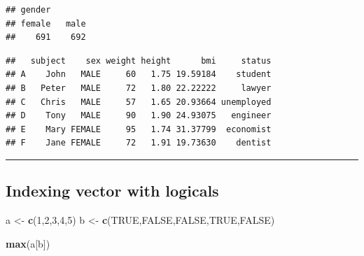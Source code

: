 \documentclass[]{article}
\newenvironment{Shaded}{\begin{snugshade}}{\end{snugshade}}
\newcommand{\KeywordTok}[1]{\textcolor[rgb]{0.13,0.29,0.53}{\textbf{{#1}}}}
\newcommand{\DataTypeTok}[1]{\textcolor[rgb]{0.13,0.29,0.53}{{#1}}}
\newcommand{\DecValTok}[1]{\textcolor[rgb]{0.00,0.00,0.81}{{#1}}}
\newcommand{\StringTok}[1]{\textcolor[rgb]{0.31,0.60,0.02}{{#1}}}
\newcommand{\CommentTok}[1]{\textcolor[rgb]{0.56,0.35,0.01}{\textit{{#1}}}}
\newcommand{\OtherTok}[1]{\textcolor[rgb]{0.56,0.35,0.01}{{#1}}}
\newcommand{\NormalTok}[1]{{#1}}
\numberwithin{equation}{section}
\begin{document}
\begin{verbatim}
## gender
## female   male 
##    691    692
\end{verbatim}

\begin{Shaded}
\end{Shaded}

\begin{verbatim}
##   subject    sex weight height      bmi     status
## A    John   MALE     60   1.75 19.59184    student
## B   Peter   MALE     72   1.80 22.22222     lawyer
## C   Chris   MALE     57   1.65 20.93664 unemployed
## D    Tony   MALE     90   1.90 24.93075   engineer
## E    Mary FEMALE     95   1.74 31.37799  economist
## F    Jane FEMALE     72   1.91 19.73630    dentist
\end{verbatim}

\begin{center}\rule{0.5\linewidth}{\linethickness}\end{center}

\subsection{Indexing vector with
logicals}\label{indexing-vector-with-logicals}

\begin{Shaded}
\begin{Highlighting}[]
\NormalTok{a <-}\StringTok{ }\KeywordTok{c}\NormalTok{(}\DecValTok{1}\NormalTok{,}\DecValTok{2}\NormalTok{,}\DecValTok{3}\NormalTok{,}\DecValTok{4}\NormalTok{,}\DecValTok{5}\NormalTok{)}
\NormalTok{b <-}\StringTok{ }\KeywordTok{c}\NormalTok{(}\OtherTok{TRUE}\NormalTok{,}\OtherTok{FALSE}\NormalTok{,}\OtherTok{FALSE}\NormalTok{,}\OtherTok{TRUE}\NormalTok{,}\OtherTok{FALSE}\NormalTok{)}

\KeywordTok{max}\NormalTok{(a[b])}
\end{Highlighting}
\end{Shaded}
\end{document}
